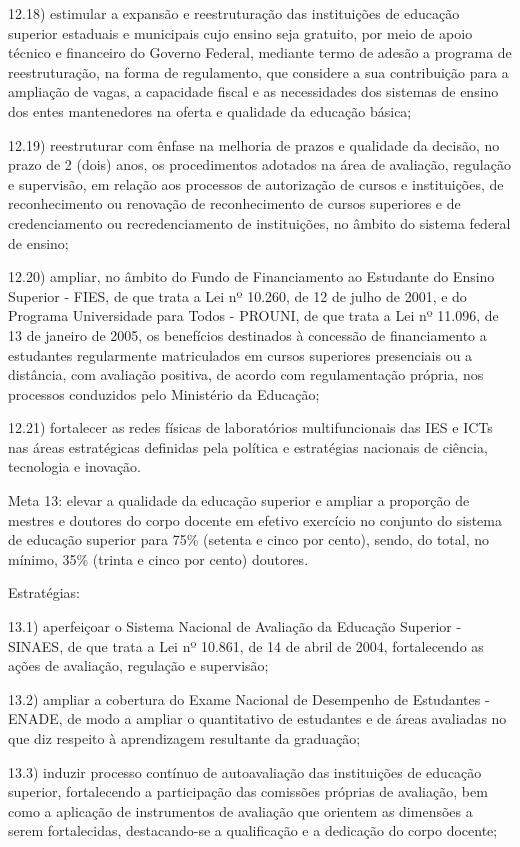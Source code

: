 \documentclass[
]{book}
\begin{document}
12.18) estimular a expansão e reestruturação das instituições de educação superior estaduais e municipais cujo ensino seja gratuito, por meio de apoio técnico e financeiro do Governo Federal, mediante termo de adesão a programa de reestruturação, na forma de regulamento, que considere a sua contribuição para a ampliação de vagas, a capacidade fiscal e as necessidades dos sistemas de ensino dos entes mantenedores na oferta e qualidade da educação básica;

12.19) reestruturar com ênfase na melhoria de prazos e qualidade da decisão, no prazo de 2 (dois) anos, os procedimentos adotados na área de avaliação, regulação e supervisão, em relação aos processos de autorização de cursos e instituições, de reconhecimento ou renovação de reconhecimento de cursos superiores e de credenciamento ou recredenciamento de instituições, no âmbito do sistema federal de ensino;

12.20) ampliar, no âmbito do Fundo de Financiamento ao Estudante do Ensino Superior - FIES, de que trata a Lei nº 10.260, de 12 de julho de 2001, e do Programa Universidade para Todos - PROUNI, de que trata a Lei nº 11.096, de 13 de janeiro de 2005, os benefícios destinados à concessão de financiamento a estudantes regularmente matriculados em cursos superiores presenciais ou a distância, com avaliação positiva, de acordo com regulamentação própria, nos processos conduzidos pelo Ministério da Educação;

12.21) fortalecer as redes físicas de laboratórios multifuncionais das IES e ICTs nas áreas estratégicas definidas pela política e estratégias nacionais de ciência, tecnologia e inovação.

Meta 13: elevar a qualidade da educação superior e ampliar a proporção de mestres e doutores do corpo docente em efetivo exercício no conjunto do sistema de educação superior para 75\% (setenta e cinco por cento), sendo, do total, no mínimo, 35\% (trinta e cinco por cento) doutores.

Estratégias:

13.1) aperfeiçoar o Sistema Nacional de Avaliação da Educação Superior - SINAES, de que trata a Lei nº 10.861, de 14 de abril de 2004, fortalecendo as ações de avaliação, regulação e supervisão;

13.2) ampliar a cobertura do Exame Nacional de Desempenho de Estudantes - ENADE, de modo a ampliar o quantitativo de estudantes e de áreas avaliadas no que diz respeito à aprendizagem resultante da graduação;

13.3) induzir processo contínuo de autoavaliação das instituições de educação superior, fortalecendo a participação das comissões próprias de avaliação, bem como a aplicação de instrumentos de avaliação que orientem as dimensões a serem fortalecidas, destacando-se a qualificação e a dedicação do corpo docente;
\end{document}
